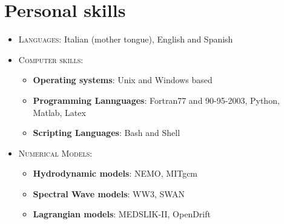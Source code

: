 \documentclass[a4paper, oneside, final]{scrartcl}
\begin{document}
\section{Personal skills}
\noindent
\normalsize

\begin{itemize}
\item \textsc{Languages:} Italian (mother tongue), English and Spanish \\

\item \textsc{Computer skills:}
        \begin{itemize}
           \item \textbf{Operating systems}: Unix and Windows based
           \item \textbf{Programming Lannguages}: Fortran77 and 90-95-2003, Python, Matlab, Latex
           \item \textbf{Scripting Languages}: Bash and Shell\\           
        \end{itemize}
\item \textsc{Numerical Models:}
        \begin{itemize}
           \item \textbf{Hydrodynamic models}: NEMO, MITgcm
           \item \textbf{Spectral Wave models}: WW3, SWAN
           \item \textbf{Lagrangian models}: MEDSLIK-II, OpenDrift\\           
        \end{itemize}                 
\end{itemize}
\end{document}
